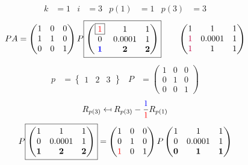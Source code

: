 \documentclass[pdf]{beamer}
\begin{document}
\begin{frame}{}\begin{align*} k &= 1 & i &= 3 & p(1) &= 1 & p(3) &= 3\end{align*} $$PA=\begin{pmatrix}1&0&0\\1&1&0\\0&0&1\end{pmatrix} P \boxed{\begin{pmatrix}\boxed{{\color{red}1}}&1&1\\0&0.0001&1\\\mathbf{{\color{blue}1}}&\mathbf{2}&\mathbf{2}\end{pmatrix}} \quad\quad \begin{pmatrix}1&1&1\\{\color{purple}1}&0.0001&1\\{\color{purple}1}&1&1\end{pmatrix}$$ \begin{align*} p&= \begin{Bmatrix}1&2&3\end{Bmatrix} & P&= \begin{pmatrix}1&0&0\\0&1&0\\0&0&1\end{pmatrix} \end{align*} $$R_{p(3)} \mapsfrom R_{p(3)} - \frac{{\color{blue}1}}{{\color{red}1}} R_{p(1)}$$ $$ P \boxed{\begin{pmatrix}1&1&1\\0&0.0001&1\\\mathbf{1}&\mathbf{2}&\mathbf{2}\end{pmatrix}} = \begin{pmatrix}1&0&0\\0&1&0\\{\color{red}1}&0&1\end{pmatrix} P \begin{pmatrix}1&1&1\\0&0.0001&1\\\mathbf{0}&\mathbf{1}&\mathbf{1}\end{pmatrix} $$\end{frame}
\end{document}
